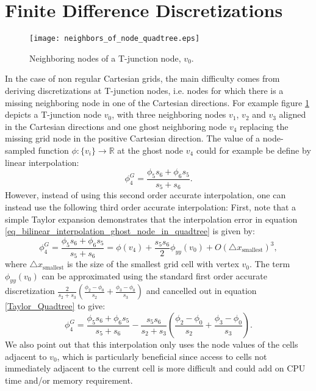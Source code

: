 \documentclass[english]{article}
\begin{document}
%
%
\section{Finite Difference Discretizations\label{sec_finite_differences}}
\begin{figure}
\begin{center}\texttt{[image: neighbors\_of\_node\_quadtree.eps]}
\end{center}
\caption{Neighboring nodes of a T-junction node,
$v_0$.\label{fig_T_junction_quadtree}}
\end{figure}

In the case of non regular Cartesian grids, the main difficulty comes from
deriving discretizations at T-junction nodes, i.e. nodes for which there is
a missing neighboring node in one of the Cartesian directions. For example
figure \ref{fig_T_junction_quadtree} depicts a T-junction node $v_0$, with
three neighboring nodes $v_1$, $v_2$ and $v_3$ aligned in the Cartesian
directions and one ghost neighboring node $v_4$ replacing the missing grid
node in the positive Cartesian direction. The value of a node-sampled
function $\phi:\{v_i\}\to\mathbb{R}$ at the ghost node $v_4$ could for
example be define by linear interpolation:
\begin{equation}
\phi_4^G = \frac{\phi_5 s_6+\phi_6 s_5}{s_5+s_6}. \label{eq_bilinear_interpolation_ghost_node_in_quadtree}
\end{equation}
However, instead of using this second order accurate interpolation, one can
instead use the following third order accurate interpolation: First, note
that a simple Taylor expansion demonstrates that the interpolation error in
equation \ref{eq_bilinear_interpolation_ghost_node_in_quadtree} is given
by:
\begin{equation}
\phi_4^G = \frac{\phi_5 s_6+\phi_6
s_5}{s_5+s_6}=\phi(v_4)+\frac{s_5s_6}{2}\phi_{yy}(v_0) + O(\triangle
x_{\textrm{smallest}})^3, \label{Taylor_Quadtree}
\end{equation}
where $\triangle x_{\textrm{smallest}}$ is the size of the smallest grid
cell with vertex $v_0$. The term $\phi_{yy}(v_0)$ can be approximated using
the standard first order accurate discretization
$\frac{2}{s_2+s_3}\left(\frac{\phi_2-\phi_0}{s_2}
+\frac{\phi_3-\phi_0}{s_3}\right)$ and cancelled out in equation
\ref{Taylor_Quadtree} to give:
\begin{equation}
\phi_4^G = \frac{\phi_5 s_6+\phi_6 s_5}{s_5+s_6}-\frac{s_5s_6}{s_2+s_3}\left(\frac{\phi_2-\phi_0}{s_2} +\frac{\phi_3-\phi_0}{s_3}\right). \label{eq_quadratic_interpolation_ghost_node_in_quadtree}
\end{equation}
We also point out that this interpolation only uses the node values of the
cells adjacent to $v_0$, which is particularly beneficial since access to
cells not immediately adjacent to the current cell is more difficult and
could add on CPU time and/or memory requirement.
\end{document}
